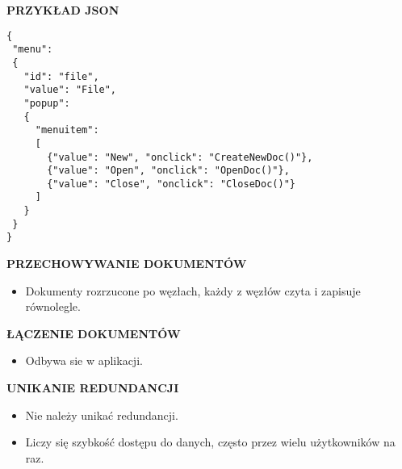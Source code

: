 \pagebreak

\textbf{PRZYKŁAD JSON}
\begin{verbatim}
{
 "menu":
 {
   "id": "file",
   "value": "File",
   "popup":
   {
     "menuitem":
     [
       {"value": "New", "onclick": "CreateNewDoc()"},
       {"value": "Open", "onclick": "OpenDoc()"},
       {"value": "Close", "onclick": "CloseDoc()"}
     ]
   }
 }
}
\end{verbatim}

\textbf{PRZECHOWYWANIE DOKUMENTÓW}
\begin{itemize}
    \item Dokumenty rozrzucone po węzłach, każdy z węzłów czyta i zapisuje
          równolegle.
\end{itemize}

\textbf{ŁĄCZENIE DOKUMENTÓW}
\begin{itemize}
    \item Odbywa sie w aplikacji.
\end{itemize}

\textbf{UNIKANIE REDUNDANCJI}
\begin{itemize}
    \item Nie należy unikać redundancji.
    \item Liczy się szybkość dostępu do danych, często przez wielu
          użytkowników na raz.
\end{itemize}
